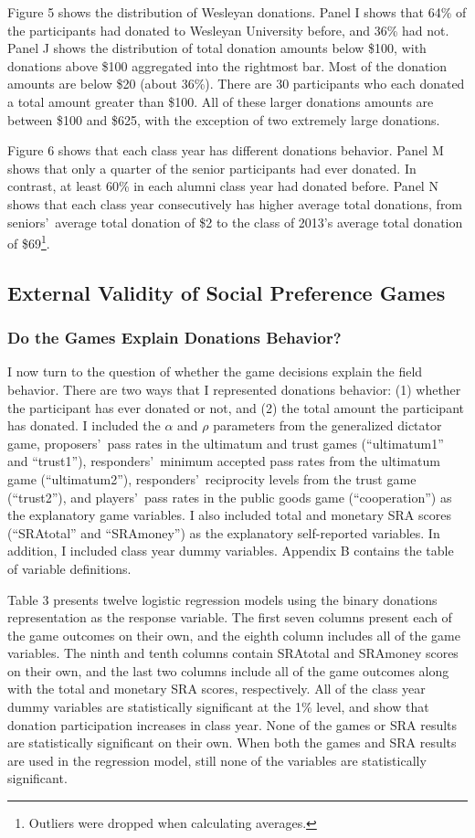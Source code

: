 \documentclass[12pt]{article}
\begin{document}
Figure 5 shows the distribution of Wesleyan donations. Panel I shows that 64\% of the participants had donated to Wesleyan University before, and 36\% had not. Panel J shows the distribution of total donation amounts below \$100, with donations above \$100 aggregated into the rightmost bar. Most of the donation amounts are below \$20 (about 36\%). There are 30 participants who each donated a total amount greater than \$100. All of these larger donations amounts are between \$100 and \$625, with the exception of two extremely large donations.

Figure 6 shows that each class year has different donations behavior. Panel M shows that only a quarter of the senior participants had ever donated. In contrast, at least 60\% in each alumni class year had donated before. Panel N shows that each class year consecutively has higher average total donations, from seniors\rq \ average total donation of \$2 to the class of 2013\rq s average total donation of \$69\footnote{Outliers were dropped when calculating averages.}.

\subsection{External Validity of Social Preference Games}

\subsubsection{Do the Games Explain Donations Behavior?}
I now turn to the question of whether the game decisions explain the field behavior. There are two ways that I represented donations behavior: (1) whether the participant has ever donated or not, and (2) the total amount the participant has donated. I included the \(\alpha\) and \(\rho\) parameters from the generalized dictator game, proposers\rq \ pass rates in the ultimatum and trust games (``ultimatum1'' and ``trust1''), responders\rq \ minimum accepted pass rates from the ultimatum game (``ultimatum2''), responders\rq \ reciprocity levels from the trust game (``trust2''), and players\rq \ pass rates in the public goods game (``cooperation'') as the explanatory game variables. I also included total and monetary SRA scores (``SRAtotal'' and ``SRAmoney'') as the explanatory self-reported variables. In addition, I included class year dummy variables. Appendix B contains the table of variable definitions. 

Table 3 presents twelve logistic regression models using the binary donations representation as the response variable. The first seven columns present each of the game outcomes on their own, and the eighth column includes all of the game variables. The ninth and tenth columns contain SRAtotal and SRAmoney scores on their own, and the last two columns include all of the game outcomes along with the total and monetary SRA scores, respectively. All of the class year dummy variables are statistically significant at the 1\% level, and show that donation participation increases in class year. None of the games or SRA results are statistically significant on their own. When both the games and SRA results are used in the regression model, still none of the variables are statistically significant. 
\end{document}
